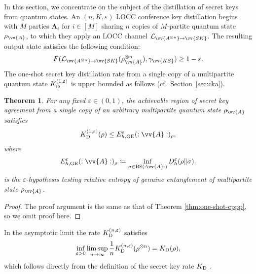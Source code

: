 \documentclass[aps,pra,twocolumn,superscriptaddress,longbibliography]{revtex4-1}
\def\GE{\operatorname{GE}}
\def\BS{\operatorname{BS}}
\newcommand{\tf}[1]{\textbf{#1}}
\newtheorem{theorem}{Theorem}
\begin{document}
In this section, we concentrate on the subject of the distillation of secret keys from quantum states. An $(n,K,\varepsilon)$ LOCC conference key distillation begins with $M$ parties $\tf{A}_i$ for $i\in[M]$ sharing $n$ copies of $M$-partite quantum state $\rho_{\vv{A}}$, to which they apply an LOCC channel $\mathcal{L}_{\vv{A^{\otimes n}}\to \vv{SK}}$. The resulting output state satisfies the following condition:
\begin{equation}
    F(\mathcal{L}_{\vv{A^{\otimes n}}\to \vv{SK}}(\rho^{\otimes n}_{\vv{A}}), \gamma_{\vv{KS}})\geq 1-\varepsilon.
\end{equation}
The one-shot secret key distillation rate from a single copy of a multipartite quantum state $K_{\textnormal{D}}^{(1,\varepsilon)}$ is upper bounded as follows (cf.~Section~\ref{sec:cka}).
\begin{theorem}\label{cor:states}
    For any fixed $\varepsilon\in (0,1)$, the achievable region of secret key agreement from a single copy of an arbitrary multipartite quantum state $\rho_{\vv{A}}$ satisfies 
    \begin{equation}\label{eqn:advanatge1}
        K_{\textnormal{D}}^{(1,\varepsilon)}(\rho)\leq E^\varepsilon_{h,\GE}(:\vv{A}:)_{\rho},
    \end{equation} 
    where 
    \begin{equation}\label{eqn:advanatge2}
        E^{\varepsilon}_{h,\GE}(:\vv{A}:)_{\rho}\coloneqq \inf_{\sigma\in\BS(:\vv{A}:)} D^\varepsilon_h(\rho\Vert\sigma).
    \end{equation}
    is the $\varepsilon$-hypothesis testing relative entropy of genuine entanglement of multipartite state $\rho_{\vv{A}}$.   
\end{theorem}
\begin{proof}
    The proof argument is the same as that of Theorem \ref{thm:one-shot-cppp}, so we omit proof here. 
\end{proof}

In the asymptotic limit the rate $K_{\textnormal{D}}^{(n,\varepsilon)}$ satisfies 
\begin{align}
    \inf_{\varepsilon>0} \limsup_{n \to \infty}\frac 1n K_{\textnormal{D}}^{(n,\varepsilon)}(\rho^{\otimes n})  = K_{\textnormal{D}}(\rho),
\end{align}
which follows directly from the definition of the secret key rate $K_{\textnormal{D}}$ \cite{AH09}.

\end{document}
